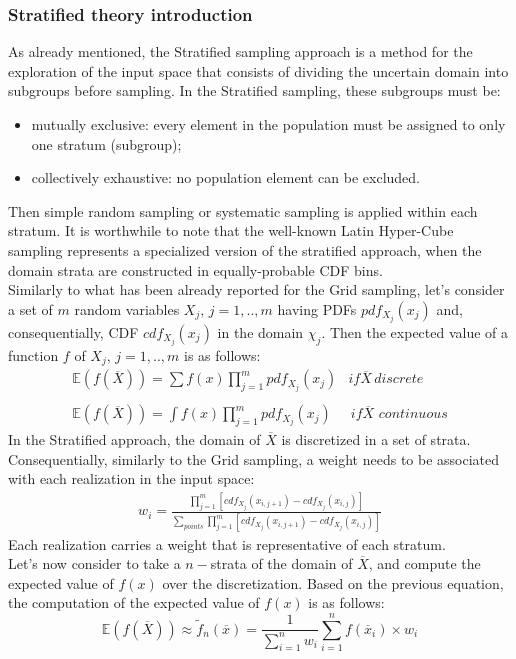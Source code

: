 \subsubsection{Stratified theory introduction}
\label{subsub:Stratifiedtheory}
As already mentioned, the Stratified sampling approach is a method for the exploration of the input space that consists of dividing the uncertain domain into subgroups before sampling. In the Stratified sampling, these subgroups must be:
\begin{itemize}
  \item mutually exclusive: every element in the population must be assigned to only one stratum (subgroup);
  \item collectively exhaustive: no population element can be excluded.
\end{itemize}
Then simple random sampling or systematic sampling is applied within each stratum. It is worthwhile to note that the well-known Latin Hyper-Cube sampling represents a specialized version of the stratified approach, when the domain strata are constructed in equally-probable CDF bins.
\\Similarly to what has been already reported for the Grid sampling, let's consider a set of  $m$ random variables $X_{j}, \, j=1,..,m$ having PDFs $pdf_{X_{j}}(x_{j})$ and, consequentially, CDF $cdf_{X_{j}}(x_{j})$ in the domain $\chi_{j}$. Then the expected value of a function $f$ of $X_{j}, \, j=1,..,m$ is as follows:
\begin{equation}
\begin{matrix}
\mathbb{E}(f(\overline{X})) =\sum f(x)   \prod_{j=1}^{m} pdf_{X_{j}}(x_{j}) & if \overline{X} \, discrete \\ 
\\ 
\mathbb{E}(f(\overline{X})) =\int f(x)\prod_{j=1}^{m} pdf_{X_{j}}(x_{j}) & \, if \overline{X} \, \, continuous
\end{matrix}
\end{equation}
In the Stratified approach, the domain of $\overline{X}$ is discretized in a set of strata. Consequentially, similarly to the Grid sampling, a weight needs to be associated with each realization in the input space:
\begin{equation}
\begin{matrix}
  w_{i}= \frac{\prod_{j=1}^{m} \left [  cdf_{X_{j}}(x_{i,j+1}) - cdf_{X_{j}}(x_{i,j}) \right ]}{\sum_{points}\prod_{j=1}^{m} \left [  cdf_{X_{j}}(x_{i,j+1}) - cdf_{X_{j}}(x_{i,j}) \right ]}
\end{matrix}  
\end{equation}
Each realization carries a weight that is representative of each stratum.
\\Let's now consider 
to take a $n-$strata of the domain of  $\overline{X}$, and compute the expected value of $f(x)$ over the discretization. Based on the previous equation, the computation of the expected value of $f(x)$ is as follows:
\begin{equation}
 \mathbb{E}(f(\overline{X})) \approx   \widetilde{f}_{n}(\overline{x}) = \frac{1}{\sum_{i=1}^{n}w_{i}} \sum_{i=1}^{n} f(\overline{x}_{i}) \times w_{i}
\end{equation}
